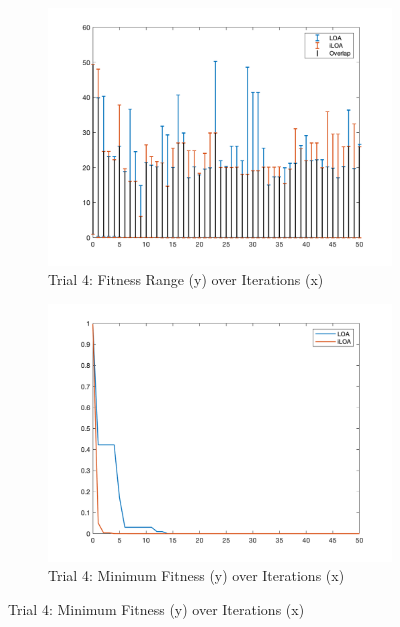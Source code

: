 \begin{figure}
  \begin{subfigure}[b]{0.4\textwidth}
    \includegraphics[width=\textwidth]{img/bars/f3/4}
    \caption{ \scriptsize Trial 4: Fitness Range (y) over Iterations (x)}
    \label{fig:f3-b-4}
  \end{subfigure}
  \begin{subfigure}[b]{0.4\textwidth}
    \includegraphics[width=\textwidth]{img/fits/f3/4}
    \caption{ \scriptsize Trial 4: Minimum Fitness (y) over Iterations (x)}
    \label{fig:f3-f-4}
  \end{subfigure}


\end{figure}
